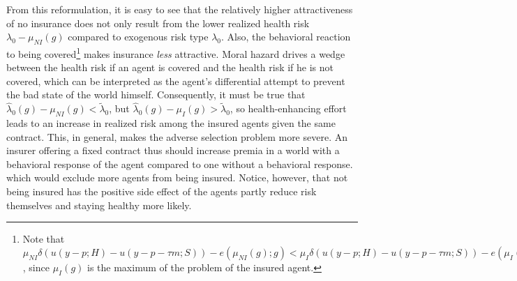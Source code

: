 From this reformulation, it is easy to see that the relatively higher attractiveness of no insurance does not only result from the lower realized health risk $\lambda_0-\mu_{NI}(g)$ compared to exogenous risk type $\lambda_0$.
Also, the behavioral reaction to being covered\footnote{Note that $\mu_{NI}\delta( u(y-p;H)-u(y-p-\tau m;S))-e(\mu_{NI}(g);g)<\mu_I\delta( u(y-p;H)-u(y-p-\tau m;S))-e(\mu_I(g);g)$, since $\mu_{I}(g)$ is the maximum of the problem of the insured agent.} makes insurance \textit{less} attractive. Moral hazard drives a wedge between the health risk if an agent is covered and the health risk if he is not covered, which can be interpreted as the agent's differential attempt to prevent the bad state of the world himself.
 Consequently, it must be true that $\hat{\lambda}_0(g)-\mu_{NI}(g)<\tilde{\lambda}_0$, but $\hat{\lambda}_0(g)-\mu_I(g)>\tilde{\lambda}_0$, so health-enhancing effort leads to an increase in realized risk among the insured agents given the same contract.
 This, in general, makes the adverse selection problem more severe.
 An insurer offering a fixed contract thus should increase premia in a world with a behavioral response of the agent compared to one without a behavioral response. which would exclude more agents from being insured. %
Notice, however, that not being insured has the positive side effect of the agents partly reduce risk themselves and staying healthy more likely.

